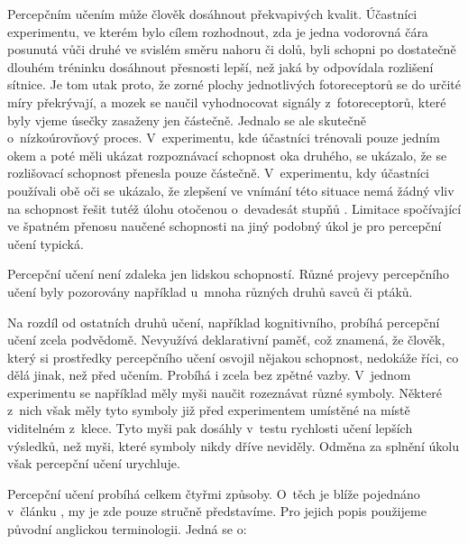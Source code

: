 Percepčním učením může člověk dosáhnout překvapivých kvalit. Účastníci
experimentu, ve kterém bylo cílem rozhodnout, zda je jedna vodorovná čára
posunutá vůči druhé ve svislém směru nahoru či dolů, byli schopni po dostatečně
dlouhém tréninku dosáhnout přesnosti lepší, než jaká by odpovídala rozlišení
sítnice. Je tom utak proto, že zorné plochy jednotlivých fotoreceptorů se do
určité míry překrývají, a mozek se naučil vyhodnocovat signály z~fotoreceptorů,
které byly vjeme úsečky zasaženy jen částečně. Jednalo se ale skutečně
o~nízkoúrovňový proces.  V~experimentu, kde účastníci trénovali pouze jedním okem
a poté měli ukázat rozpoznávací schopnost oka druhého, se ukázalo, že se
rozlišovací schopnost přenesla pouze částečně. V~experimentu, kdy účastníci
používali obě oči se ukázalo, že zlepšení ve vnímání této situace nemá žádný
vliv na schopnost řešit tutéž úlohu otočenou o~devadesát stupňů \citep{uceni}.  
Limitace spočívající ve špatném přenosu naučené schopnosti na jiný podobný úkol
je pro percepční učení typická.

Percepční učení není zdaleka jen lidskou schopností. Různé projevy percepčního
učení byly pozorovány například u~mnoha různých druhů savců či ptáků. 

Na rozdíl od ostatních druhů učení, například kognitivního, probíhá percepční
učení zcela podvědomě. Nevyužívá deklarativní paměť, což znamená, že člověk,
který si prostředky percepčního učení osvojil nějakou schopnost, nedokáže říci,
co dělá jinak, než před učením. Probíhá i zcela bez zpětné vazby. V~jednom
experimentu se například měly myši naučit rozeznávat různé symboly. Některé
z~nich však měly tyto symboly již před experimentem umístěné na místě viditelném
z~klece. Tyto myši pak dosáhly v~testu rychlosti učení lepších výsledků, než
myši, které symboly nikdy dříve neviděly. Odměna za splnění úkolu však
percepční učení urychluje.

Percepční učení probíhá celkem čtyřmi způsoby. O~těch je blíže pojednáno
v~článku \citep{uceni}, my je zde pouze stručně představíme. Pro jejich popis použijeme původní anglickou terminologii. Jedná se o:

